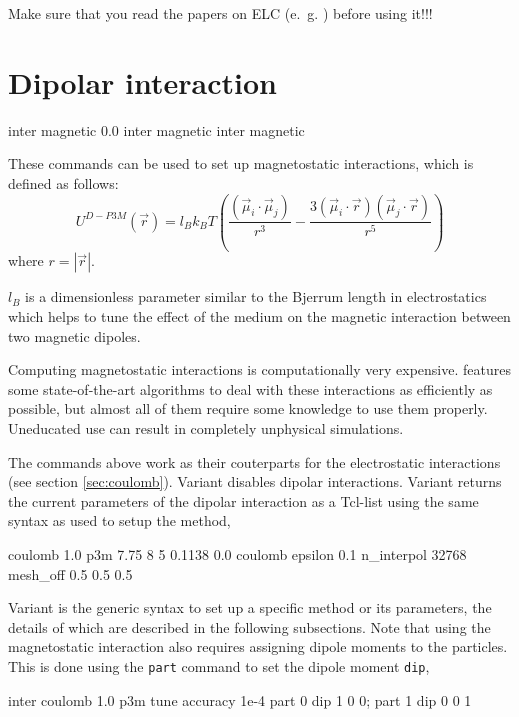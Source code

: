 Make sure that you read the papers on ELC (e.~g. \cite{brodka04a,
  tyagi08a}) before using it!!!

\section{Dipolar interaction}
\label{sec:inter-dipolar}

\begin{essyntax}
   inter magnetic 0.0
   inter magnetic
   inter magnetic 
\end{essyntax}

These commands can be used to set up magnetostatic interactions, which
is defined as follows:
\begin{equation}
  U^{D-P3M}(\vec{r}) = l_{B} k_B T \left( \frac{(\vec{\mu}_i \cdot \vec{\mu}_j)}{r^3} 
  - \frac{3  (\vec{\mu}_i \cdot \vec{r})  (\vec{\mu}_j \cdot \vec{r}) }{r^5} \right)
\end{equation}
where $r=|\vec{r}|$.

$l_{B}$ is a dimensionless parameter similar to the Bjerrum length in
electrostatics which helps to tune the effect of the medium on the
magnetic interaction between two magnetic dipoles.

Computing magnetostatic interactions is computationally very
expensive.  \es{} features some state-of-the-art algorithms to deal
with these interactions as efficiently as possible, but almost all of
them require some knowledge to use them properly.  Uneducated use can
result in completely unphysical simulations.

The commands above work as their couterparts for the electrostatic
interactions (see section \vref{sec:coulomb}).  Variant 
disables dipolar interactions.  Variant  returns the
current parameters of the dipolar interaction as a Tcl-list using the
same syntax as used to setup the method, \eg
\begin{tclcode}
  {coulomb 1.0 p3m 7.75 8 5 0.1138 0.0}
  {coulomb epsilon 0.1 n_interpol 32768 mesh_off 0.5 0.5 0.5}
\end{tclcode}

Variant  is the generic syntax to set up a specific method
or its parameters, the details of which are described in the following
subsections.  Note that using the magnetostatic interaction also
requires assigning dipole moments to the particles.  This is done
using the \texttt{part} command to set the dipole moment \texttt{dip},
\eg
\begin{tclcode}
  inter coulomb 1.0 p3m tune accuracy 1e-4
  part 0 dip 1 0 0; part 1 dip 0 0 1
\end{tclcode}

